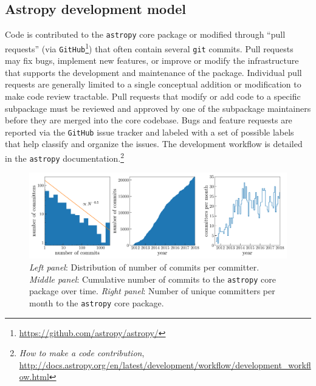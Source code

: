 \documentclass[modern]{aastex62}
\newcommand{\package}[1]{\texttt{#1}\xspace}
\newcommand{\github}{\package{GitHub}}
\newcommand{\astropypkg}{\package{astropy}}
\begin{document}
\subsection{Astropy development model}

Code is contributed to the \astropypkg core package or modified through ``pull
requests'' (via \github\footnote{\url{https://github.com/astropy/astropy/}})
that often contain several \texttt{git} commits.
Pull requests may fix bugs, implement new features, or improve or modify the
infrastructure that supports the development and maintenance of the package.
Individual pull requests are generally limited to a single conceptual addition
or modification to make code review tractable.
Pull requests that modify or add code to a specific subpackage must be reviewed
and approved by one of the subpackage maintainers before they are merged into
the core codebase.
Bugs and feature requests are reported via the \github issue tracker and labeled
with a set of possible labels that help classify and organize the issues.
The development workflow is detailed in the \astropypkg
documentation.\footnote{\emph{How to make a code contribution},
\url{http://docs.astropy.org/en/latest/development/workflow/development_workflow.html}}

\begin{figure}
\includegraphics[width=\textwidth]{commits.pdf}
\caption{%
    \emph{Left panel}: Distribution of number of commits per committer.
    \emph{Middle panel}: Cumulative number of commits to the \astropypkg core
    package over time.
    \emph{Right panel}: Number of unique committers per month to the
    \astropypkg core package.
    \label{fig:ncommits}
}
\end{figure}
\end{document}
